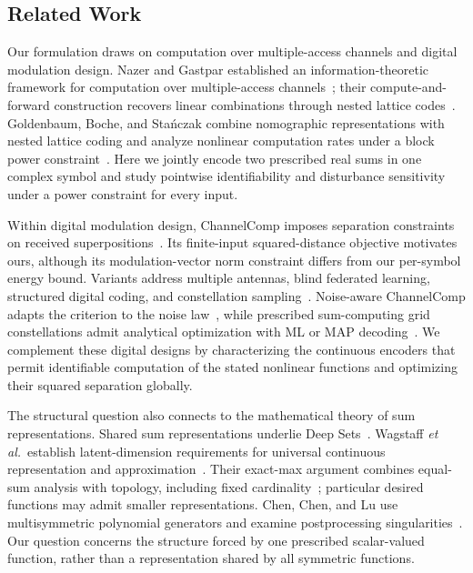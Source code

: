 \subsection{Related Work}
Our formulation draws on computation over multiple-access channels and digital modulation design. Nazer and Gastpar established an information-theoretic framework for computation over multiple-access channels~\cite{nazer2007}; their compute-and-forward construction recovers linear combinations through nested lattice codes~\cite{nazer2011}. Goldenbaum, Boche, and Sta\'nczak combine nomographic representations with nested lattice coding and analyze nonlinear computation rates under a block power constraint~\cite{goldenbaum2015}. Here we jointly encode two prescribed real sums in one complex symbol and study pointwise identifiability and disturbance sensitivity under a power constraint for every input.

Within digital modulation design, ChannelComp imposes separation constraints on received superpositions~\cite{channelcomp2024}. Its finite-input squared-distance objective motivates ours, although its modulation-vector norm constraint differs from our per-symbol energy bound. Variants address multiple antennas, blind federated learning, structured digital coding, and constellation sampling~\cite{veccomp2026,blindfl2024,sumcomp2025,pyramidsampling2025}. Noise-aware ChannelComp adapts the criterion to the noise law~\cite{noiseaware2025}, while prescribed sum-computing grid constellations admit analytical optimization with ML or MAP decoding~\cite{towards2025}. We complement these digital designs by characterizing the continuous encoders that permit identifiable computation of the stated nonlinear functions and optimizing their squared separation globally.

The structural question also connects to the mathematical theory of sum representations. Shared sum representations underlie Deep Sets~\cite{zaheer2017}. Wagstaff \emph{et al.}\ establish latent-dimension requirements for universal continuous representation and approximation~\cite{wagstaff19,wagstaff22}. Their exact-max argument combines equal-sum analysis with topology, including fixed cardinality~\cite[Thm. 14 and Lemma 17]{wagstaff22}; particular desired functions may admit smaller representations. Chen, Chen, and Lu use multisymmetric polynomial generators and examine postprocessing singularities~\cite{chen2024}. Our question concerns the structure forced by one prescribed scalar-valued function, rather than a representation shared by all symmetric functions.

